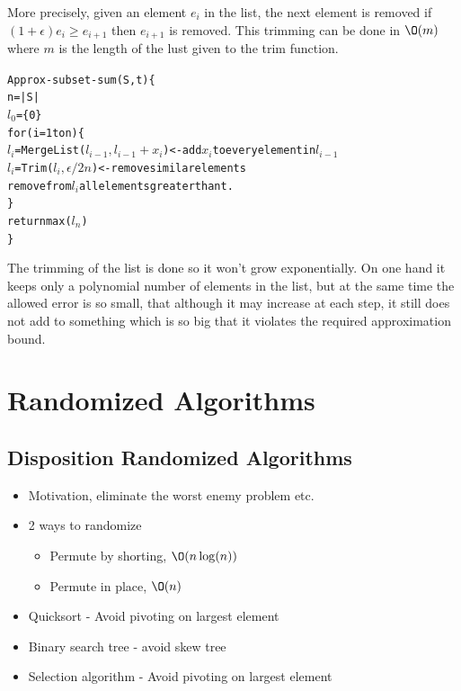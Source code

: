 \documentclass[10pt]{article}
\begin{document}
More precisely, given an element $e_i$ in the list, the next element is removed if $(1+\epsilon)e_i\geq e_{i+1}$ then $e_{i+1}$ is removed. This trimming can be done in $\O(m)$ where $m$ is the length of the lust given to the trim function.

\begin{alltt}
Approx-subset-sum(S,t)\{
  n = |S|
  \(l_0\) = \{0\}
  for(i=1 to n)\{
    \(l_i\) = MergeList(\(l_{i-1},l_{i-1}+x_i\))  <- add \(x_i\) to every element in \(l_{i-1}\)
    \(l_i\) = Trim(\(l_{i},\epsilon/2n\))            <- remove similar elements
    remove from \(l_i\) all elements greater than t.
  \}
  return max(\(l_n\))
\}  
\end{alltt}

The trimming of the list is done so it won't grow exponentially. On one hand it keeps only a polynomial number of elements in the list, but at the same time the allowed error is so small, that although it may increase at each step, it still does not add to something which is so big that it violates the required approximation bound.




\clearpage \newpage
\section{Randomized Algorithms} %

\subsection{Disposition Randomized Algorithms} %
\label{sub:disposition_randomized_algorithms}
\begin{itemize}
  \item Motivation, eliminate the worst enemy problem etc.
  \item 2 ways to randomize
  \begin{itemize}
    \item Permute by shorting, $\O(n\log(n))$
    \item Permute in place, $\O(n)$
  \end{itemize}
  \item Quicksort - Avoid pivoting on largest element
  \item Binary search tree - avoid skew tree
  \item Selection algorithm - Avoid pivoting on largest element
\end{itemize}
\end{document}
